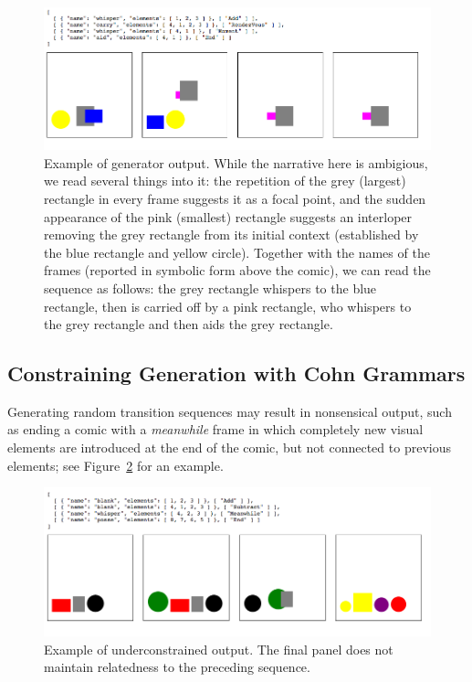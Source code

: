 \begin{figure}
\includegraphics[width=\columnwidth]{comicgen-unconstrained-ok.png}
\caption{Example of generator output.
While the narrative here is ambigious, we read several things into it:
the repetition of the grey (largest) rectangle in every frame suggests it
as a focal point, and the sudden appearance of the pink (smallest)
rectangle suggests an interloper removing the grey rectangle from its
initial context (established by the blue rectangle and yellow circle).
Together with the names of the frames (reported in symbolic form above the
comic), we can read the sequence as follows: the grey rectangle whispers to
the blue rectangle, then is carried off by a pink rectangle, who whispers
to the grey rectangle and then aids the grey rectangle.
}
\label{fig:out1}
\end{figure}

\subsection{Constraining Generation with Cohn Grammars}
Generating random transition sequences may result in nonsensical output,
such as ending a comic with a \emph{meanwhile} frame in which completely new
visual elements are introduced at the end of the comic, but not connected to 
previous elements; see Figure~\ref{fig:outbad} for an example. 

\begin{figure}
\includegraphics[width=\columnwidth]{comicgen-underconstrained-2.png}
\caption{Example of underconstrained output. The final panel does not
maintain relatedness to the preceding sequence.}
\label{fig:outbad}
\end{figure}

